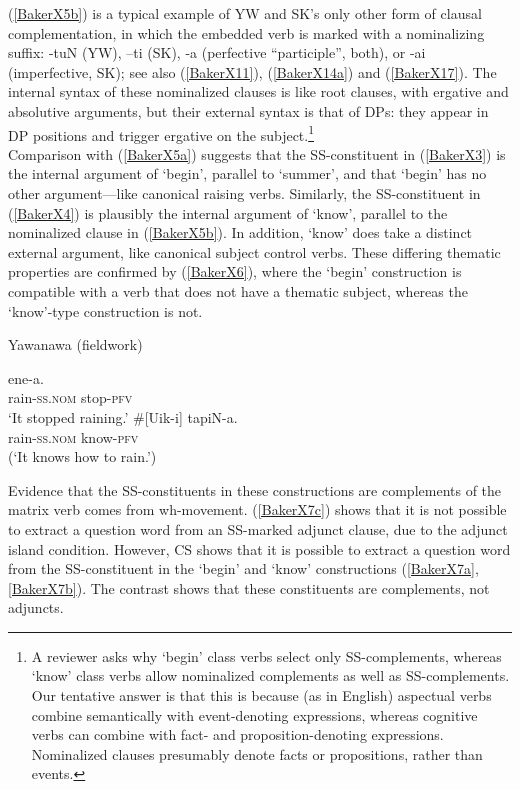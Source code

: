 \documentclass[output=paper,colorlinks,citecolor=brown,
]{langscibook}
\renewcommand{\sc}[1]{\textsc{#1}}
\begin{document}
(\ref{BakerX5b}) is a typical example of YW and SK’s only other form of clausal complementation, in which the embedded verb is marked with a nominalizing suffix: -tuN (YW), –ti (SK), -a (perfective “participle”, both), or -ai (imperfective, SK); see also (\ref{BakerX11}), (\ref{BakerX14a}) and (\ref{BakerX17}). The internal syntax of these nominalized clauses is like root clauses, with ergative and absolutive arguments, but their external syntax is that of DPs: they appear in DP positions and trigger ergative on the subject.\footnote{A reviewer asks why `begin’ class verbs select only SS-complements, whereas `know’ class verbs allow nominalized complements as well as SS-complements. Our tentative answer is that this is because (as in English) aspectual verbs combine semantically with event-denoting expressions, whereas cognitive verbs can combine with fact- and proposition-denoting expressions. Nominalized clauses presumably denote facts or propositions, rather than events.}\\

Comparison with (\ref{BakerX5a}) suggests that the SS-constituent in (\ref{BakerX3}) is the internal argument of `begin’, parallel to `summer’, and that `begin’ has no other argument—like canonical raising verbs. Similarly, the SS-constituent in (\ref{BakerX4}) is plausibly the internal argument of `know’, parallel to the nominalized clause in (\ref{BakerX5b}). In addition, `know’ does take a distinct external argument, like canonical subject control verbs. These differing thematic properties are confirmed by (\ref{BakerX6}), where the `begin’ construction is compatible with a verb that does not have a thematic subject, whereas the `know’-type construction is not.

\begin{exe}
    \ex Yawanawa (fieldwork) \label{BakerX6}
        \begin{xlist}
        \ex \label{BakerX6a}
			\gll [Uik-i] ene-a.\\
			     rain-\sc{ss.nom} stop-\sc{pfv}\\
			    \glt `It stopped raining.'
			\ex \label{BakerX6b}
			\gll \#[Uik-i] tapiN-a.\\
    			 rain-\sc{ss.nom} know-\sc{pfv}\\
			    \glt (`It knows how to rain.')
        \end{xlist}
\end{exe}

Evidence that the SS-constituents in these constructions are complements of the matrix verb comes from wh-movement. (\ref{BakerX7c}) shows that it is not possible to extract a question word from an SS-marked adjunct clause, due to the adjunct island condition. However, CS shows that it is possible to extract a question word from the SS-constituent in the ‘begin’ and ‘know’ constructions (\ref{BakerX7a},\ref{BakerX7b}). The contrast shows that these constituents are complements, not adjuncts.
\end{document}
